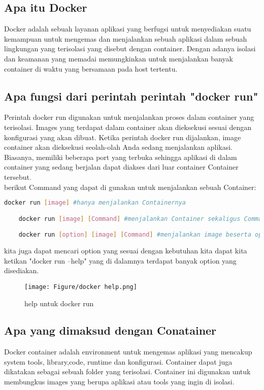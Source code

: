 \documentclass[11pt,a4paper]{article}
\begin{document}
\subsection{Apa itu Docker}
Docker adalah sebuah layanan aplikasi yang berfugsi untuk menyediakan suatu kemampuan untuk mengemas dan menjalankan sebuah aplikasi dalam sebuah lingkungan yang terisolasi yang disebut dengan container. Dengan adanya isolasi dan keamanan yang memadai memungkinkan untuk menjalankan banyak container di waktu yang bersamaan pada host tertentu.\cite{shinta_2021}

\subsection{Apa fungsi dari perintah perintah "docker run"}
Perintah docker run digunakan untuk menjalankan proses dalam container yang terisolasi. Images yang
terdapat dalam container akan dieksekusi sesuai dengan konfigurasi yang akan dibuat. Ketika perintah docker
run dijalankan, image container akan dieksekusi seolah-olah Anda sedang menjalankan aplikasi. Biasanya,
memiliki beberapa port yang terbuka sehingga aplikasi di dalam container yang sedang berjalan dapat diakses
dari luar container
Container tersebut.\\
berikut Command yang dapat di gunakan untuk menjalankan sebuah Container:
\begin{lstlisting}[language = bash]
	docker run [image] #hanya menjalankan Containernya

	docker run [image] [Command] #menjalankan Container sekaligus Commandnya (contoh Command = echo)

	docker run [option] [image] [Command] #menjalankan image beserta option yang terdapat pada docker(Contoh option = -i)
\end{lstlisting}
kita juga dapat mencari option yang sesuai dengan kebutuhan kita dapat kita ketikan "docker run --help" yang di dalamnya terdapat banyak option yang disediakan.

\begin{figure}[h]
	\centering
	\texttt{[image: Figure/docker help.png]}
	\caption{help untuk docker run}
\end{figure}

\subsection{Apa yang dimaksud dengan Conatainer}
Docker container adalah environment untuk mengemas aplikasi yang mencakup system tools, library,code, runtime dan konfigurasi. Container dapat juga dikatakan sebagai sebuah folder yang terisolasi. Container ini digunakan untuk 
membungkus images yang berupa aplikasi atau tools yang ingin di isolasi. 
\end{document}
